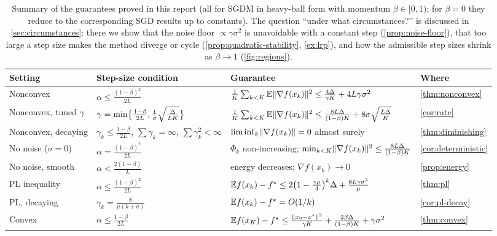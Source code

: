 \begin{table}[ht]
\centering\small
\renewcommand{\arraystretch}{1.25}
\begin{tabularx}{\textwidth}{@{}l l >{\raggedright\arraybackslash}X l@{}}
\toprule
Setting & Step-size condition & Guarantee & Where\\
\midrule
Nonconvex & $\alpha\le\frac{(1-\beta)^2}{2L}$ &
  $\frac1K\sum_{k<K}\mathbb{E}\lVert \nabla f(x_k)\rVert^2\le\frac{4\Delta}{\gamma K}+4L\gamma\sigma^2$ &
  \cref{thm:nonconvex}\\
Nonconvex, tuned $\gamma$ & $\gamma=\min\bigl\{\frac{1-\beta}{2L},\frac1\sigma\sqrt{\frac{\Delta}{LK}}\bigr\}$ &
  $\frac1K\sum_{k<K}\mathbb{E}\lVert \nabla f(x_k)\rVert^2\le\frac{8L\Delta}{(1-\beta)K}+8\sigma\sqrt{\frac{L\Delta}{K}}$ &
  \cref{cor:rate}\\
Nonconvex, decaying & $\gamma_k\le\frac{1-\beta}{2L}$, $\sum\gamma_k=\infty$, $\sum\gamma_k^2<\infty$ &
  $\liminf_k\lVert \nabla f(x_k)\rVert=0$ almost surely &
  \cref{thm:diminishing}\\
No noise ($\sigma=0$) & $\alpha=\frac{(1-\beta)^2}{2L}$ &
  $\Phi_k$ non-increasing; $\min_{k<K}\lVert \nabla f(x_k)\rVert^2\le\frac{8L\Delta}{(1-\beta)K}$ &
  \cref{cor:deterministic}\\
No noise, smooth & $\alpha<\frac{2(1-\beta)}{L}$ &
  energy decreases; $\nabla f(x_k)\to0$ &
  \cref{prop:energy}\\
PL inequality & $\alpha\le\frac{(1-\beta)^2}{2L}$ &
  $\mathbb{E} f(x_k)-f^\star\le2\bigl(1-\frac{\gamma\mu}{4}\bigr)^k\Delta+\frac{8L\gamma\sigma^2}{\mu}$ &
  \cref{thm:pl}\\
PL, decaying & $\gamma_k=\frac{8}{\mu(k+a)}$ &
  $\mathbb{E} f(x_k)-f^\star=O(1/k)$ &
  \cref{cor:pl-decay}\\
Convex & $\alpha\le\frac{1-\beta}{2L}$ &
  $\mathbb{E} f(\bar x_K)-f^\star\le\frac{\lVert x_0-x^\star\rVert^2}{\gamma K}+\frac{2\beta\Delta}{(1-\beta)K}+\gamma\sigma^2$ &
  \cref{thm:convex}\\
\bottomrule
\end{tabularx}
\caption{Summary of the guarantees proved in this report (all for SGDM in heavy-ball form
with momentum $\beta\in[0,1)$; for $\beta=0$ they reduce to the corresponding SGD results
up to constants). The question ``under what circumstances?'' is discussed in
\cref{sec:circumstances}: there we show that the noise floor $\propto\gamma\sigma^2$ is
unavoidable with a constant step (\cref{prop:noise-floor}), that too large a step size
makes the method diverge or cycle (\cref{prop:quadratic-stability},
\cref{ex:lrp}), and how the admissible step sizes shrink as $\beta\to1$
(\cref{fig:regions}).}
\label{tab:summary}
\end{table}

